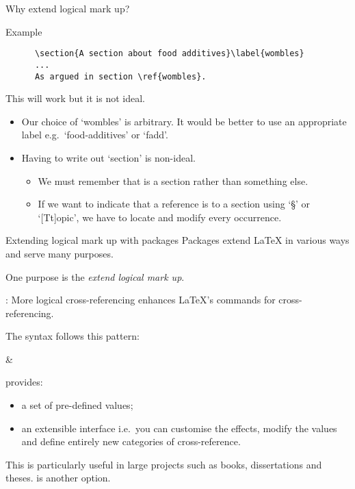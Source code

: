 \begin{frame}[fragile]{Why extend logical mark up?}
  \begin{block}{Example}
	\begin{verbatim}
	  \section{A section about food additives}\label{wombles}
	  ...
	  As argued in section \ref{wombles}.
	\end{verbatim}
  \end{block}
  This will work but it is not ideal.
  \begin{itemize}
    \item Our choice of ‘wombles’ is arbitrary.
	It would be better to use an appropriate label e.g.~‘food-additives’ or ‘fadd’.
	\item Having to write out ‘section’ is non-ideal.
	\begin{itemize}
	  \item We must remember that  is a section rather than something else.
	  \item If we want to indicate that a reference is to a section using ‘\S’ or ‘[Tt]opic’, we have to locate and modify every occurrence.
	\end{itemize}
  \end{itemize}
\end{frame}

\begin{frame}[fragile]{Extending logical mark up with packages}
  Packages extend \LaTeX{} in various ways and serve many purposes.

  One purpose is the \emph{extend logical mark up}.
\end{frame}
\begin{frame}{: More logical cross-referencing}
  \alert<1>{} enhances \LaTeX's commands for cross-referencing.

  The syntax follows this pattern:
  \begin{semiverbatim}
     \& \alert<1>{}
  \end{semiverbatim}
   provides:
  \begin{itemize}
    \item a set of pre-defined \alert<2>{} values;
    \item an extensible interface i.e.~you can customise the effects, modify the \alert<2>{} values and define entirely new categories of cross-reference.
  \end{itemize}
  This is particularly useful in large projects such as books, dissertations and theses.
  \alert<3>{} is another option.
\end{frame}

